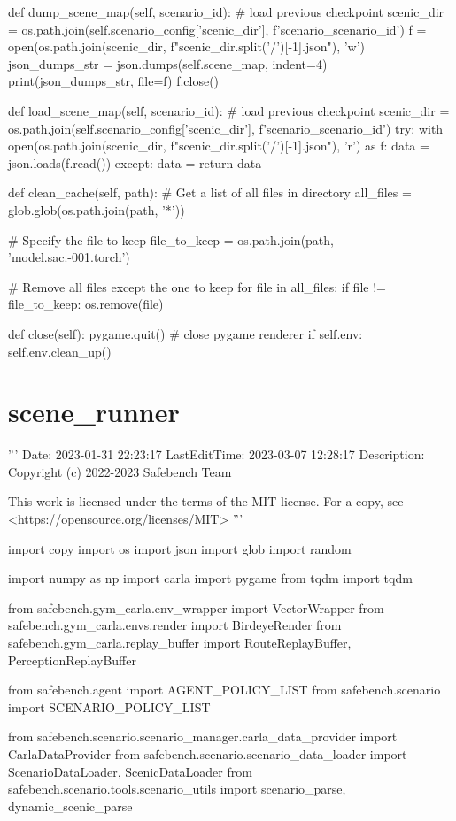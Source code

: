 \begin{appendix}
def dump\_scene\_map(self, scenario\_id):
\# load previous checkpoint
scenic\_dir = os.path.join(self.scenario\_config['scenic\_dir'], f'scenario\_{scenario\_id}')
f = open(os.path.join(scenic\_dir, f"{scenic\_dir.split('/')[-1]}.json"), 'w')
json\_dumps\_str = json.dumps(self.scene\_map, indent=4)
print(json\_dumps\_str, file=f)
f.close()

def load\_scene\_map(self, scenario\_id):
\# load previous checkpoint
scenic\_dir = os.path.join(self.scenario\_config['scenic\_dir'], f'scenario\_{scenario\_id}')
try:
with open(os.path.join(scenic\_dir, f"{scenic\_dir.split('/')[-1]}.json"), 'r') as f:
data = json.loads(f.read())
except:
data = {}
return data

def clean\_cache(self, path):
\# Get a list of all files in directory
all\_files = glob.glob(os.path.join(path, '*'))

\# Specify the file to keep
file\_to\_keep = os.path.join(path, 'model.sac.-001.torch')

\# Remove all files except the one to keep
for file in all\_files:
if file != file\_to\_keep:
os.remove(file)

def close(self):
pygame.quit() \# close pygame renderer
if self.env:
self.env.clean\_up()

\section{scene\_runner}
''' 
Date: 2023-01-31 22:23:17
LastEditTime: 2023-03-07 12:28:17
Description: 
Copyright (c) 2022-2023 Safebench Team

This work is licensed under the terms of the MIT license.
For a copy, see <https://opensource.org/licenses/MIT>
'''

import copy
import os
import json
import glob
import random

import numpy as np
import carla
import pygame
from tqdm import tqdm

from safebench.gym\_carla.env\_wrapper import VectorWrapper
from safebench.gym\_carla.envs.render import BirdeyeRender
from safebench.gym\_carla.replay\_buffer import RouteReplayBuffer, PerceptionReplayBuffer

from safebench.agent import AGENT\_POLICY\_LIST
from safebench.scenario import SCENARIO\_POLICY\_LIST

from safebench.scenario.scenario\_manager.carla\_data\_provider import CarlaDataProvider
from safebench.scenario.scenario\_data\_loader import ScenarioDataLoader, ScenicDataLoader
from safebench.scenario.tools.scenario\_utils import scenario\_parse, dynamic\_scenic\_parse


\end{appendix}
